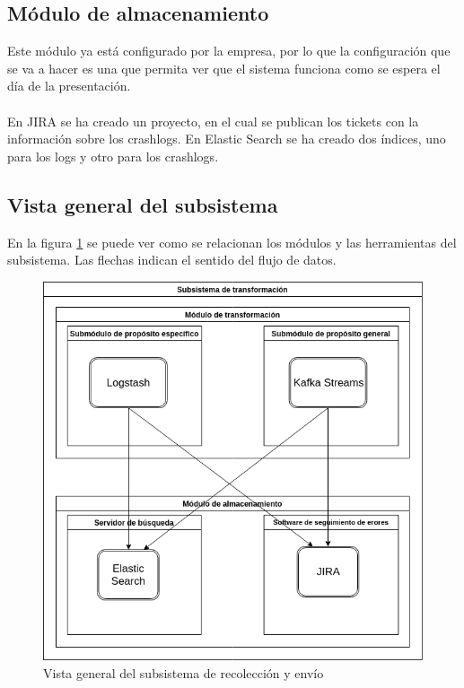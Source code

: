 \subsection{Módulo de almacenamiento}
Este módulo ya está configurado por la empresa, por lo que la configuración que se va a hacer es una que permita ver que el sistema funciona como se espera el día de la presentación.
\\\\
En JIRA se ha creado un proyecto, en el cual se publican los tickets con la información sobre los crashlogs.
En Elastic Search se ha creado dos índices, uno para los logs y otro para los crashlogs.

\subsection{Vista general del subsistema}
En la figura \ref{fig:subtra} se puede ver como se relacionan los módulos y las herramientas del subsistema. Las flechas indican el sentido del flujo de datos.

\begin{figure}
	\includegraphics[width=\linewidth]{Moduloss-subtran.png}
	\caption{Vista general del subsistema de recolección y envío}
	\label{fig:subtra}
\end{figure}

